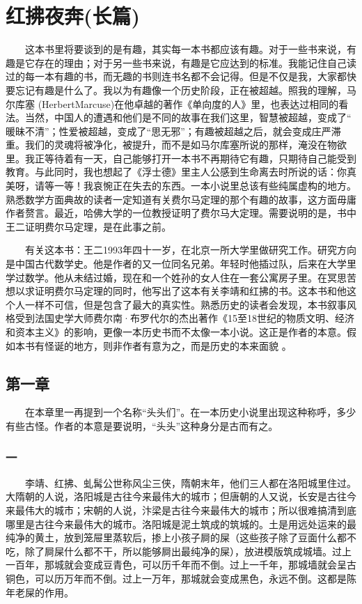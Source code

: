 \chapter{红拂夜奔(长篇)}

　　这本书里将要谈到的是有趣，其实每一本书都应该有趣。对于一些书来说，有趣是它存在的理由；对于另一些书来说，有趣是它应达到的标准。我能记住自己读过的每一本有趣的书，而无趣的书则连书名都不会记得。但是不仅是我，大家都快 要忘记有趣是什么了。我以为有趣像一个历史阶段，正在被超越。照我的理解，马尔库塞 (HerbertMarcuse)在他卓越的著作《单向度的人》里，也表达过相同的看法。当然，中国人的遭遇和他们是不同的故事在我们这里，智慧被超越，变成了“ 暖昧不清”；性爱被超越，变成了“思无邪”；有趣被超越之后，就会变成庄严滞重。我们的灵魂将被净化，被提升，而不是如马尔库塞所说的那样，淹没在物欲里。我正等待着有一天，自己能够打开一本书不再期待它有趣，只期待自己能受到教育。与此同时，我也想起了《浮士德》里主人公感到生命离去时所说的话：你真美呀，请等一等！我哀惋正在失去的东西。一本小说里总该有些纯属虚构的地方。熟悉数学方面典故的读者一定知道有关费尔马定理的那个有趣的故事，这方面毋庸作者赘言。最近，哈佛大学的一位教授证明了费尔马大定理。需要说明的是，书中王二证明费尔马定理，是在此事之前。 
 
 
 　　有关这本书：王二1993年四十一岁，在北京一所大学里做研究工作。研究方向是中国古代数学史。他是作者的又一位同名兄弟。年轻时他插过队，后来在大学里学过数学。他从未结过婚，现在和一个姓孙的女人住在一套公寓房子里。在冥思苦想以求证明费尔马定理的同时，他写出了这本有关李靖和红拂的书。这本书和他这个人一样不可信，但是包含了最大的真实性。熟悉历史的读者会发现，本书叙事风格受到法国史学大师费尔南·布罗代尔的杰出著作《15至18世纪的物质文明、经济和资本主义》的影响，更像一本历史书而不太像一本小说。这正是作者的本意。假如本书有怪诞的地方，则非作者有意为之，而是历史的本来面貌 。 
 

\section{第一章}
 
 　　在本章里一再提到一个名称“头头们”。在一本历史小说里出现这种称呼，多少有些古怪。作者的本意是要说明，“头头”这种身分是古而有之。 
 
 
\subsection{一}
 
 　　李靖、红拂、虬髯公世称风尘三侠，隋朝末年，他们三人都在洛阳城里住过。 大隋朝的人说，洛阳城是古往今来最伟大的城市；但唐朝的人又说，长安是古往今 来最伟大的城市；宋朝的人说，汴梁是古往今来最伟大的城市；所以很难搞清到底 哪里是古往今来最伟大的城市。洛阳城是泥土筑成的筑城的。土是用远处运来的最 纯净的黄土，放到笼屉里蒸软后，掺上小孩子屙的屎（这些孩子除了豆面什么都不 吃，除了屙屎什么都不干，所以能够屙出最纯净的屎），放进模版筑成城墙。过上 一百年，那城就会变成豆青色，可以历千年而不倒。过上一千年，那城墙就会呈古 铜色，可以历万年而不倒。过上一万年，那城就会变成黑色，永远不倒。这都是陈 年老屎的作用。

